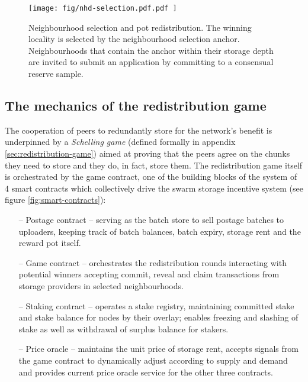 \begin{figure}[!ht]
  \centering
    \texttt{[image: fig/nhd-selection.pdf.pdf    ]}
  \caption[Neighbourhood selection and pot redistribution]{Neighbourhood selection and pot redistribution. The winning locality is selected by the neighbourhood selection anchor. Neighbourhoods that contain the anchor within their storage depth are invited to submit an application by committing to a consensual reserve sample. }
\label{fig:neighbourhood-selection}
\end{figure}    

    


\subsection{The mechanics of the redistribution game}\label{sec:mechanics}

The cooperation of peers to redundantly store for the network's benefit is underpinned by a \emph{Schelling game} (defined formally in appendix \ref{sec:redistribution-game}) aimed at proving that the peers agree on the chunks they need to store and they do, in fact, store them. The redistribution game itself is orchestrated by the game contract, one of the building blocks of the system of 4 smart contracts which collectively drive the swarm storage incentive system (see figure \ref{fig:smart-contracts}):

\begin{itemize}
    \item[--] Postage contract -- serving as the batch store to sell postage batches to uploaders, keeping track of batch balances, batch expiry, storage rent and the reward pot itself.
    \item[--] Game contract -- orchestrates the redistribution rounds interacting with potential winners accepting commit, reveal and claim transactions from storage providers in selected neighbourhoods.
    \item[--] Staking contract -- operates a stake registry, maintaining committed stake and stake balance for nodes by their overlay; enables freezing and slashing of stake as well as withdrawal of surplus balance for stakers.
    \item[--] Price oracle -- maintains the unit price of  storage rent, accepts signals from the game contract to dynamically adjust according to supply and demand and provides current price oracle service for the other three contracts.
\end{itemize}


